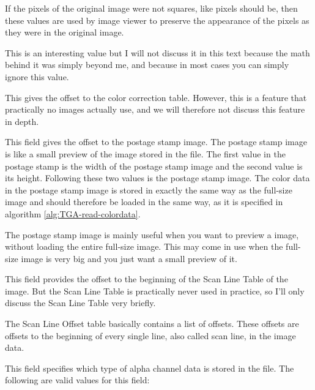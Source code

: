 
If the pixels of the original image were not squares, like pixels
should be, then these values are used by image viewer to preserve the
appearance of the pixels as they were in the original image.


This is an interesting value but I will not discuss it in this text
because the math behind it was simply beyond me, and because in most
cases you can simply ignore this value.


This gives the offset to the color correction table. However, this is
a feature that practically no \tga images actually use, and we will
therefore not discuss this feature in depth.


This field gives the offset to the postage stamp image. The postage
stamp image is like a small preview of the image stored in the
file. The first value in the postage stamp is the width of the postage
stamp image and the second value is its height. Following these two
values is the postage stamp image. The color data in the postage stamp
image is stored in exactly the same way as the full-size image and
should therefore be loaded in the same way, as it is specified in
algorithm \ref{alg:TGA-read-colordata}.

The postage stamp image is mainly useful when you want to preview a
\tga image, without loading the entire full-size image. This may come
in use when the full-size image is very big and you just want a small
preview of it.


This field provides the offset to the beginning of the Scan Line Table
of the image. But the Scan Line Table is practically never used in
practice, so I'll only discuss the Scan Line Table very briefly.

The Scan Line Offset table basically contains a list of offsets. These
offsets are offsets to the beginning of every single line, also called
scan line, in the image data.


This field specifies which type of alpha channel data is stored in the
file. The following are valid values for this field:

